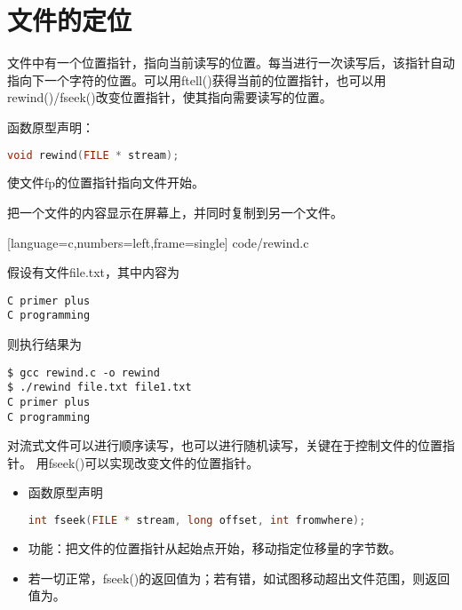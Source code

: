 \section{文件的定位}
\begin{frame}[fragile]\ft{\secname}
文件中有一个位置指针，指向当前读写的位置。每当进行一次读写后，该指针自动指向下一个字符的位置。可以用{\tf ftell()}获得当前的位置指针，也可以用{\tf rewind()/fseek()}改变位置指针，使其指向需要读写的位置。
\end{frame}

\begin{frame}[fragile]
函数原型声明：
\begin{lstlisting}[language=c,backgroundcolor=\color{red!20}]
void rewind(FILE * stream);
\end{lstlisting}
使文件{\tf fp}的位置指针指向文件开始。
\end{frame}

\begin{frame}[fragile]
\begin{li}
把一个文件的内容显示在屏幕上，并同时复制到另一个文件。
\end{li}
\end{frame}

\begin{frame}
  
  [language=c,numbers=left,frame=single]
  {code/rewind.c}
\end{frame}

\begin{frame}[fragile]
  假设有文件{\tf file.txt}，其中内容为
  \begin{lstlisting}[backgroundcolor=\color{red!20}]
C primer plus
C programming
  \end{lstlisting}
  则执行结果为
  \begin{lstlisting}[backgroundcolor=\color{red!20}]
$ gcc rewind.c -o rewind
$ ./rewind file.txt file1.txt
C primer plus
C programming
  \end{lstlisting}
  
\end{frame}

\begin{frame}[fragile]
对流式文件可以进行顺序读写，也可以进行随机读写，关键在于控制文件的位置指针。
用{\tf fseek()}可以实现改变文件的位置指针。
\begin{itemize}
\item 
函数原型声明
\begin{lstlisting}[language=c,backgroundcolor=\color{red!20}]
int fseek(FILE * stream, long offset, int fromwhere);
\end{lstlisting}
\item
功能：把文件的位置指针从起始点开始，移动指定位移量的字节数。
\item 
若一切正常，{\tf fseek()}的返回值为{}；若有错，如试图移动超出文件范围，则返回值为{}。
\end{itemize}
\end{frame}

